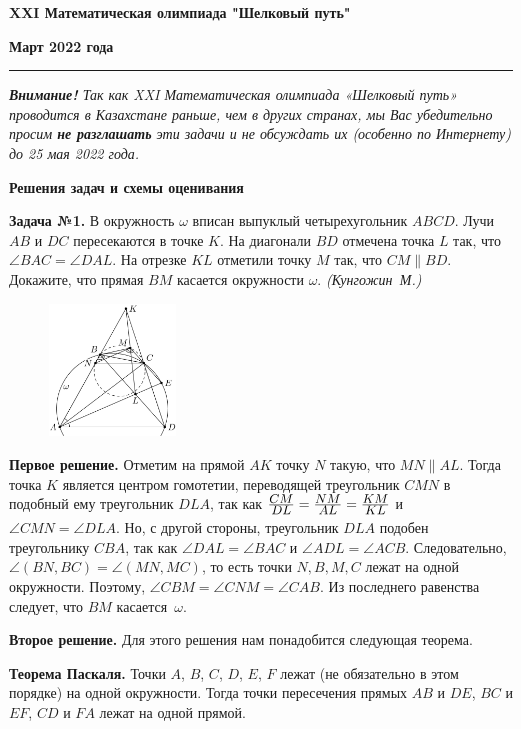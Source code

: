 \documentclass[12pt]{article}
\def \Problem#1{\par \bigskip \textbf{Задача №{#1}. }}
\def \solutionI{\par \bigskip \textbf{Первое решение. }}
\def \solutionII{\par \bigskip \textbf{Второе решение. }}
\def\frac#1#2{\mathchoice{#1\over#2}{\hbox{\small$#1$}\over\mathstrut\hbox{\small$#2$}}{#1\over#2}{#1\over#2}}
\begin{document}
\centerline{\sc \textbf{XXI Математическая олимпиада "Шелковый путь"}}

\centerline{\sc \textbf{Март 2022 года}}

\bigskip
\hrule
\bigskip

\textsl{\textbf{Внимание!} 
Так как XXI Математическая олимпиада «Шелковый путь» проводится в Казахстане
раньше, чем в других странах, мы Вас убедительно просим \textbf{не разглашать}
эти задачи и не обсуждать их (особенно по Интернету) до 25 мая 2022 года.}

\bigskip

\centerline{\sc \textbf{Решения задач и схемы оценивания}}

\bigskip
\Problem{1} В окружность $\omega$ вписан выпуклый четырехугольник $ABCD$. Лучи $AB$ и $DC$ пересекаются в точке $K$. На диагонали $BD$ отмечена точка $L$ так, что $\angle BAC = \angle DAL$. На отрезке $KL$ отметили точку $M$ так, что $CM \parallel BD$. Докажите, что прямая $BM$ касается окружности $\omega$. \textit{(Кунгожин~М.)}

\begin{figure}
\includegraphics[width=0.3\textwidth]{img_1.jpg}
\end{figure}
\solutionI Отметим на прямой $AK$ точку $N$ такую, что $MN \parallel AL$. Тогда точка $K$ является центром гомотетии, переводящей треугольник $CMN$ в подобный ему треугольник $DLA$, так как $\frac{CM}{DL}=\frac{NM}{AL}=\frac{KM}{KL}$ и $\angle CMN=\angle DLA$. Но, с другой стороны, треугольник $DLA$ подобен треугольнику $CBA$, так как $\angle DAL=\angle BAC$ и $\angle ADL = \angle ACB$. Следовательно, $\angle(BN, BC)=\angle(MN,MC)$, то есть точки $N,B,M,C$ лежат на одной окружности. Поэтому, $\angle CBM=\angle CNM=\angle CAB$. Из последнего равенства следует, что $BM$ касается~$\omega$.

\solutionII Для этого решения нам понадобится следующая теорема.

\textbf{Теорема Паскаля.} Точки $A$, $B$, $C$, $D$, $E$, $F$ лежат (не обязательно в этом порядке) на одной окружности. Тогда точки пересечения прямых $AB$ и $DE$, $BC$ и $EF$, $CD$ и $FA$ лежат на одной прямой.
\end{document}
